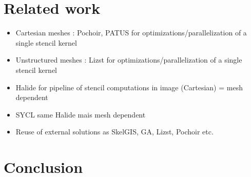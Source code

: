 \documentclass[twocolumn]{svjour3}          %
\begin{document}
\section{Related work}
\label{sect:rel}
\begin{itemize}
\item Cartesian meshes : Pochoir, PATUS for optimizations/parallelization of a single stencil kernel
\item Unstructured meshes : Lizst for optimizations/parallelization of a single stencil kernel
\item Halide for pipeline of stencil computations in image (Cartesian) = mesh dependent
\item SYCL same Halide mais mesh dependent
\item Reuse of external solutions as SkelGIS, GA, Lizst, Pochoir etc.
\end{itemize}
\section{Conclusion}
\label{sect:concl}




\end{document}
